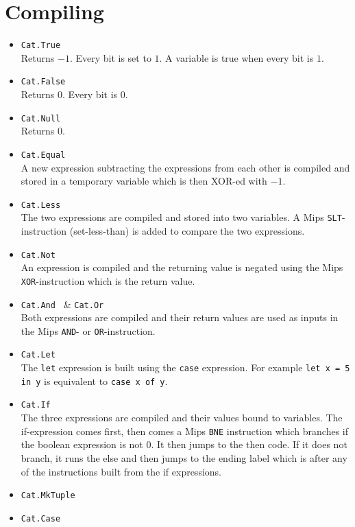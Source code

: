 \documentclass{article}
\begin{document}
\section{Compiling}
\begin{itemize}
	\item {\tt Cat.True } \\
	Returns $-1$. Every bit is set to $1$. A variable is true when every bit is $1$.
	\item {\tt Cat.False } \\
	Returns $0$. Every bit is $0$. 
	\item {\tt Cat.Null } \\
	Returns $0$.
	\item {\tt Cat.Equal } \\
	A new expression subtracting the expressions from each other is compiled and stored in a temporary variable which is then XOR-ed with $-1$.
	\item {\tt Cat.Less } \\
	The two expressions are compiled and stored into two variables. A Mips {\tt SLT}-instruction (set-less-than) is added to compare the two expressions.
	\item {\tt Cat.Not } \\
	An expression is compiled and the returning value is negated using the Mips {\tt XOR}-instruction which is the return value.
	\item {\tt Cat.And } \& {\tt Cat.Or } \\
	Both expressions are compiled and their return values are used as inputs in the Mips {\tt AND}- or {\tt OR}-instruction.
	\item {\tt Cat.Let } \\
	The {\tt let} expression is built using the {\tt case} expression. For example {\tt let x = 5 in y} is equivalent to {\tt case x of y}.
	\item {\tt Cat.If } \\
	The three expressions are compiled and their values bound to variables. The if-expression comes first, then comes a Mips {\tt BNE} instruction which branches if the boolean expression is not $0$. It then jumps to the then code.
	If it does not branch, it runs the else and then jumps to the ending label which is after any of the instructions built from the if expressions.
	\item {\tt Cat.MkTuple } \\
	\item {\tt Cat.Case } \\
\end{itemize}
\end{document}

